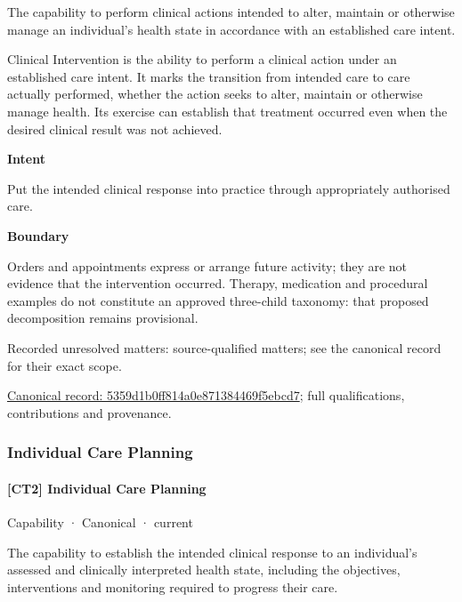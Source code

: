 The capability to perform clinical actions intended to alter, maintain or otherwise manage an individual's health state in accordance with an established care intent.



Clinical Intervention is the ability to perform a clinical action under an established care intent. It marks the transition from intended care to care actually performed, whether the action seeks to alter, maintain or otherwise manage health. Its exercise can establish that treatment occurred even when the desired clinical result was not achieved.



\textbf{Intent}



Put the intended clinical response into practice through appropriately authorised care.



\textbf{Boundary}



Orders and appointments express or arrange future activity; they are not evidence that the intervention occurred. Therapy, medication and procedural examples do not constitute an approved three-child taxonomy: that proposed decomposition remains provisional.


{\small Recorded unresolved matters: source-qualified matters; see the canonical record for their exact scope.}\par
{\footnotesize \href{../../../../continuum/strategy/capability/5359d1b0ff814a0e871384469f5ebcd7.md}{Canonical record: 5359d1b0ff814a0e871384469f5ebcd7}; full qualifications, contributions and provenance.}\par
\subsubsection{Individual Care Planning}

\paragraph{[CT2] Individual Care Planning}

\label{element:f036a9866459429a8fb5f5e10727b5e8}
{\small Capability · Canonical · current}\par

The capability to establish the intended clinical response to an individual's assessed and clinically interpreted health state, including the objectives, interventions and monitoring required to progress their care.



